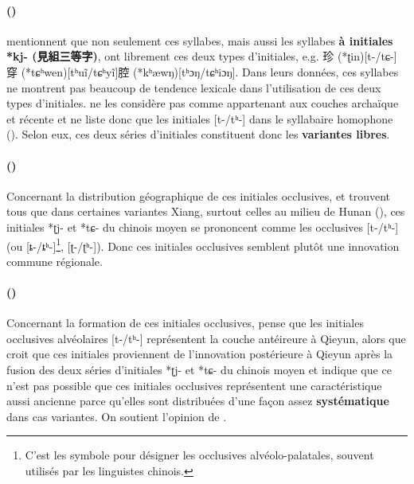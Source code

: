 \documentclass{scrbook}
\newcounter{c}[subsubsection]
\newcommand{\stpc}[1]{\stepcounter{#1}}
\newcommand{\difwenbai}{couches archaïque et récente\xspace}
\newcommand{\termyyx}[1]{\textbf{#1}}
\begin{document}
\begin{sloppypar}
\stpc{c}\paragraph{()}
\textcite[12]{Yan1994Loudi} mentionnent que non seulement ces syllabes, mais aussi les syllabes \termyyx{à initiales *kj- (見組三等字)}, ont librement ces deux types d'initiales, e.g. 珍 (*ʈin)[t-/tɕ-]穿 (*tɕʰwen)[tʰuĩ/tɕʰyĩ]腔 (*kʰæwŋ)[tʰɔŋ/tɕʰiɔŋ]. Dans leurs données, ces syllabes ne montrent pas beaucoup de tendence lexicale dans l'utilisation de ces deux types d'initiales. \textcite[8--9]{Liu2001loudi} ne les considère pas comme appartenant aux \difwenbai et ne liste donc que les initiales [t-/tʰ-] dans le syllabaire homophone (\textcite[42--88]{Liu2001loudi}). Selon eux, ces deux séries d'initiales constituent donc les \textbf{variantes libres}.


\stpc{c}\paragraph{()}
Concernant la distribution géographique de ces initiales occlusives, \textcite[20--25]{Zhou2005xiang} et \textcite[68--70]{Peng2010xiang} trouvent tous que dans certaines variantes Xiang, surtout celles au milieu de Hunan (\cite[23--24]{Zhou2005xiang}), ces initiales *ʈj- et *tɕ- du chinois moyen se prononcent comme les occlusives [t-/tʰ-] (ou [ȶ-/ȶʰ-]\footnote{C'est les symbole pour désigner les occlusives alvéolo-palatales, souvent utilisés par les linguistes chinois.}, [ʈ-/ʈʰ-]). Donc ces initiales occlusives semblent plutôt une innovation commune régionale.

\stpc{c}\paragraph{()}
Concernant la formation de ces initiales occlusives, \textcite[31--33]{Zhou2005xiang} pense que les initiales occlusives alvéolaires [t-/tʰ-] représentent la couche antéireure à Qieyun, alors que \textcite[70--79]{Peng2010xiang} croit que ces initiales proviennent de l'innovation postérieure à Qieyun après la fusion des deux séries d'initiales *ʈj- et *tɕ- du chinois moyen et indique que ce n'est pas possible que ces initiales occlusives représentent une caractéristique aussi ancienne parce qu'elles sont distribuées d'une façon assez \textbf{systématique} dans cas variantes. On soutient l'opinion de \citeauthor{Peng2010xiang}.


\end{sloppypar}
\end{document}
